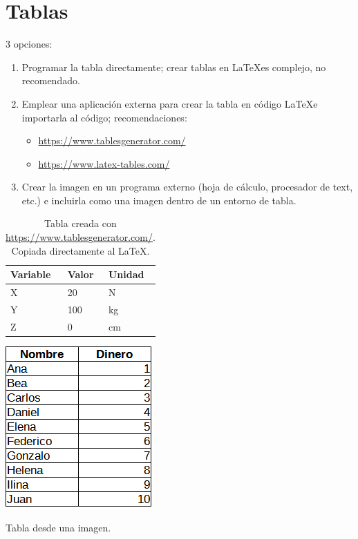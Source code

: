 \chapter{Tablas}
3 opciones:
\begin{enumerate}
	\item Programar la tabla directamente; crear tablas en \LaTeX es complejo, no recomendado.
	\item Emplear una aplicación externa para crear la tabla en código \LaTeX e importarla al código; recomendaciones:
		\begin{itemize}
			\item  \href{https://www.tablesgenerator.com/}{https://www.tablesgenerator.com/}
			\item \href{https://www.latex-tables.com/}{https://www.latex-tables.com/}
		\end{itemize}
	\item Crear la imagen en un programa externo (hoja de cálculo, procesador de text, etc.) e incluirla como una imagen dentro de un entorno de tabla.
\end{enumerate}
%
\begin{table}[H]
	\centering
	\begin{tabular}{@{}lll@{}}
		\toprule
		Variable & Valor & Unidad \\ \midrule
		X        & 20    & N      \\
		Y        & 100   & kg     \\
		Z        & 0     & cm     \\ \bottomrule
	\end{tabular}
	\caption[Tabla creada con \url{https://www.tablesgenerator.com/}.]{Tabla creada con \url{https://www.tablesgenerator.com/}. Copiada directamente al \LaTeX.}
	\label{tab:tabla-1}
\end{table}
%

%
\begin{table}[H]
	\centering
	\includegraphics[scale=1]{cuerpo/cap-objetos/tablas/tabla-imagen-calc}
	\caption{Tabla desde una imagen.}
	\label{tab:tabla-3}
\end{table}

